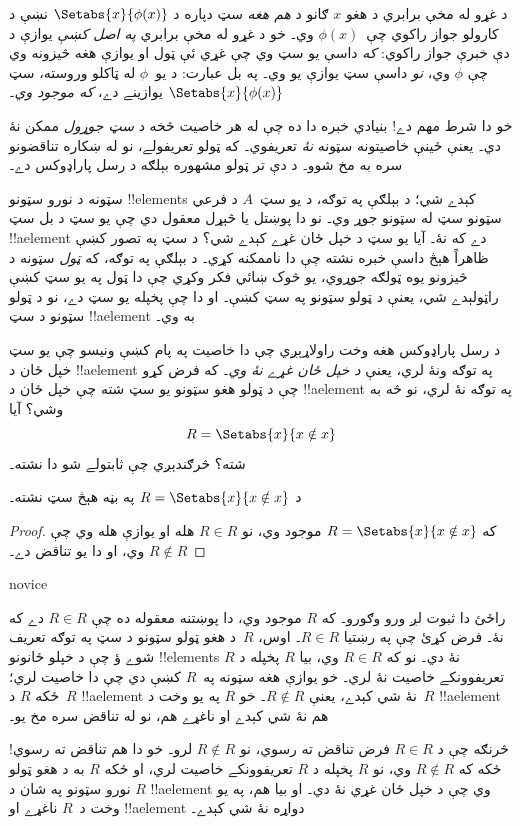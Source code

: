 \documentclass[../../../include/open-logic-section]{subfiles}
\begin{document}

د غړو له مخې برابري د هغو $x$ ګانو د \emph{هم هغه} سټ دپاره د $\Setabs{x}{\phi(x)}$ نښې د کارولو جواز راکوي چې~$\phi(x)$ وي۔ خو د غړو له مخې برابري \emph{په اصل کښې} يوازې د دې خبرې جواز راکوي: \emph{که} داسې يو سټ وي چې غړي ئې ټول او يوازې هغه څيزونه وي چې $\phi$ وي، \emph{نو} داسې سټ يوازې يو وي۔ په بل عبارت: د يو~$\phi$ له ټاکلو وروسته، سټ $\Setabs{x}{\phi(x)}$ يوازينے دے، \emph{که موجود وي}۔

خو دا شرط مهم دے!{} بنيادي خبره دا ده چې له هر خاصيت څخه د \emph{سټ جوړول} ممکن نۀ دي۔ يعنې ځينې خاصيتونه سټونه \emph{نۀ} تعريفوي۔ که ټولو تعريفولے، نو له ښکاره تناقضونو سره به مخ شوو۔ د دې تر ټولو مشهوره بېلګه د رسل پاراډوکس دے۔

سټونه د نورو سټونو !!{element}s کېدے شي؛ د بېلګې په توګه، د يو سټ~$A$ د فرعي سټونو سټ له سټونو جوړ وي۔ نو دا پوښتل يا څېړل معقول دي چې يو سټ د بل سټ !!a{element} دے که نۀ۔ آيا يو سټ د خپل ځان غړے کېدے شي؟ د سټ په تصور کښې ظاهراً هېڅ داسې خبره نشته چې دا ناممکنه کړي۔ د بېلګې په توګه، که \emph{ټول} سټونه د څيزونو يوه ټولګه جوړوي، يو څوک ښائي فکر وکړي چې دا ټول په يو سټ کښې راټولېدے شي، يعنې د ټولو سټونو په سټ کښې۔ او دا چې پخپله يو سټ دے، نو د ټولو سټونو د سټ !!a{element} به وي۔

د رسل پاراډوکس هغه وخت راولاړېږي چې دا خاصيت په پام کښې ونيسو چې يو سټ خپل ځان د !!a{element} په توګه ونۀ لري، يعنې \emph{د خپل ځان غړے نۀ وي}۔ که فرض کړو چې د ټولو هغو سټونو يو سټ شته چې خپل ځان د !!a{element} په توګه نۀ لري، نو څه به وشي؟ آيا
\[
R = \Setabs{x}{x \notin x}
\]
شته؟ څرګندېږي چې ثابتولے شو دا نشته۔

\begin{thm}
	د $R = \Setabs{x}{x \notin x}$ په بڼه هېڅ سټ نشته۔
\end{thm}

\begin{proof}
که $R = \Setabs{x}{x \notin x}$ موجود وي، نو $R \in R$ هله او يوازې هله وي چې $R \notin R$ وي، او دا يو تناقض دے۔
\end{proof}

\begin{tagblock}{novice}
\begin{explain}
راځئ دا ثبوت لږ ورو وګورو۔ که $R$ موجود وي، دا پوښتنه معقوله ده چې $R \in R$ دے که نۀ۔ فرض کړئ چې په رښتيا $R \in R$۔ اوس، $R$~د هغو ټولو سټونو د سټ په توګه تعريف شوے ؤ چې د خپلو ځانونو !!{element}s نۀ دي۔ نو که $R \in R$ وي، بيا $R$ پخپله د $R$ تعريفوونکے خاصيت نۀ لري۔ خو يوازې هغه سټونه په~$R$ کښې دي چې دا خاصيت لري؛ ځکه $R$ د~$R$ !!a{element} نۀ شي کېدے، يعنې $R \notin R$۔ خو $R$ په يو وخت د~$R$ !!a{element} هم نۀ شي کېدے او ناغړے هم، نو له تناقض سره مخ يو۔

څرنګه چې د $R \in R$ فرض تناقض ته رسوي، نو $R \notin R$ لرو۔ خو دا هم تناقض ته رسوي!{} ځکه که $R \notin R$ وي، نو $R$ پخپله د $R$ تعريفوونکے خاصيت لري، او ځکه $R$ به د هغو ټولو نورو سټونو په شان د $R$ !!a{element} وي چې د خپل ځان غړي نۀ دي۔ او بيا هم، په يو وخت د~$R$ ناغړے او !!a{element} دواړه نۀ شي کېدے۔
\end{explain}
\end{tagblock}
\end{document}
